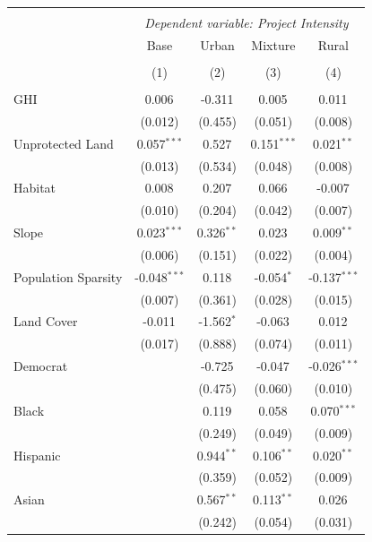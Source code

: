 \begin{table}[!htbp] \centering
\begin{tabular}{@{\extracolsep{5pt}}lcccc}
\\[-1.8ex]\hline
\hline \\[-1.8ex]
& \multicolumn{4}{c}{\textit{Dependent variable: Project Intensity}} \
\cr \cline{2-5}
\\[-1.8ex] & \multicolumn{1}{c}{Base} & \multicolumn{1}{c}{Urban} & \multicolumn{1}{c}{Mixture} & \multicolumn{1}{c}{Rural}  \\
\\[-1.8ex] & (1) & (2) & (3) & (4) \\
\hline \\[-1.8ex]
 GHI & 0.006$^{}$ & -0.311$^{}$ & 0.005$^{}$ & 0.011$^{}$ \\
& (0.012) & (0.455) & (0.051) & (0.008) \\
 Unprotected Land & 0.057$^{***}$ & 0.527$^{}$ & 0.151$^{***}$ & 0.021$^{**}$ \\
& (0.013) & (0.534) & (0.048) & (0.008) \\
 Habitat & 0.008$^{}$ & 0.207$^{}$ & 0.066$^{}$ & -0.007$^{}$ \\
& (0.010) & (0.204) & (0.042) & (0.007) \\
 Slope & 0.023$^{***}$ & 0.326$^{**}$ & 0.023$^{}$ & 0.009$^{**}$ \\
& (0.006) & (0.151) & (0.022) & (0.004) \\
 Population Sparsity & -0.048$^{***}$ & 0.118$^{}$ & -0.054$^{*}$ & -0.137$^{***}$ \\
& (0.007) & (0.361) & (0.028) & (0.015) \\
 Land Cover & -0.011$^{}$ & -1.562$^{*}$ & -0.063$^{}$ & 0.012$^{}$ \\
& (0.017) & (0.888) & (0.074) & (0.011) \\
 Democrat & & -0.725$^{}$ & -0.047$^{}$ & -0.026$^{***}$ \\
& & (0.475) & (0.060) & (0.010) \\
 Black & & 0.119$^{}$ & 0.058$^{}$ & 0.070$^{***}$ \\
& & (0.249) & (0.049) & (0.009) \\
 Hispanic & & 0.944$^{**}$ & 0.106$^{**}$ & 0.020$^{**}$ \\
& & (0.359) & (0.052) & (0.009) \\
 Asian & & 0.567$^{**}$ & 0.113$^{**}$ & 0.026$^{}$ \\
& & (0.242) & (0.054) & (0.031) \\

\end{tabular}
\end{table}
